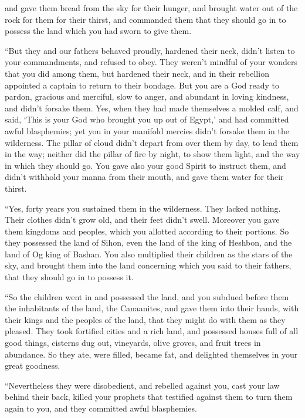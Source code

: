 {and gave them bread from the sky for their hunger, and brought water out of the rock for them for their thirst, and commanded them that they should go in to possess the land which you had sworn to give them.
\par }{\PP {}“But they and our fathers behaved proudly, hardened their neck, didn’t listen to your commandments,
and refused to obey. They weren’t mindful of your wonders that you did among them, but hardened their neck, and in their rebellion appointed a captain to return to their bondage. But you are a God ready to pardon, gracious and merciful, slow to anger, and abundant in loving kindness, and didn’t forsake them.
Yes, when they had made themselves a molded calf, and said, ‘This is your God who brought you up out of Egypt,’ and had committed awful blasphemies;
yet you in your manifold mercies didn’t forsake them in the wilderness. The pillar of cloud didn’t depart from over them by day, to lead them in the way; neither did the pillar of fire by night, to show them light, and the way in which they should go.
You gave also your good Spirit to instruct them, and didn’t withhold your manna from their mouth, and gave them water for their thirst.
\par }{\PP {}“Yes, forty years you sustained them in the wilderness. They lacked nothing. Their clothes didn’t grow old, and their feet didn’t swell.
Moreover you gave them kingdoms and peoples, which you allotted according to their portions. So they possessed the land of Sihon, even the land of the king of Heshbon, and the land of Og king of Bashan.
You also multiplied their children as the stars of the sky, and brought them into the land concerning which you said to their fathers, that they should go in to possess it.
\par }{\PP {}“So the children went in and possessed the land, and you subdued before them the inhabitants of the land, the Canaanites, and gave them into their hands, with their kings and the peoples of the land, that they might do with them as they pleased.
They took fortified cities and a rich land, and possessed houses full of all good things, cisterns dug out, vineyards, olive groves, and fruit trees in abundance. So they ate, were filled, became fat, and delighted themselves in your great goodness.
\par }{\PP {}“Nevertheless they were disobedient, and rebelled against you, cast your law behind their back, killed your prophets that testified against them to turn them again to you, and they committed awful blasphemies.
}
